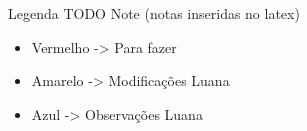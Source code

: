\documentclass[tc,oneside]{iiufrgs}
\begin{document}
	
	
	
	        
	\listoftodos
    \newpage
     Legenda TODO Note (notas inseridas no latex)
	\begin{itemize}
	\item \color{red} Vermelho -> Para fazer
	\color{black}
	\item \color{yellow} Amarelo -> Modificações Luana
	\color{black}
	\item \color{blue} Azul -> Observações Luana
	\end{itemize}	
\end{document}
